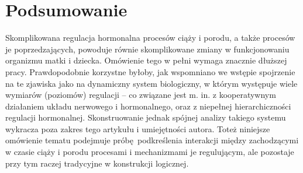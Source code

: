 \documentclass[two column, twoside, a4paper]{article}
\begin{document}
\section{Podsumowanie}

Skomplikowana regulacja hormonalna procesów ciąży i porodu, a także procesów je poprzedzających, powoduje równie skomplikowane zmiany w funkcjonowaniu organizmu matki i dziecka. Omówienie tego w pełni wymaga znacznie dłuższej pracy. Prawdopodobnie korzystne byłoby, jak wspomniano we wstępie spojrzenie na te zjawiska jako na dynamiczny system biologiczny, w którym występuje wiele wymiarów (poziomów) regulacji -- co związane jest m. in. z kooperatywnym działaniem układu nerwowego i hormonalnego, oraz z niepełnej hierarchiczności regulacji hormonalnej. Skonstruowanie jednak spójnej analizy takiego systemu wykracza poza zakres tego artykułu i umiejętności autora. Toteż niniejsze omówienie tematu podejmuje próbę podkreślenia interakcji między zachodzącymi w czasie ciąży i porodu procesami i mechanizmami je regulującym, ale pozostaje przy tym raczej tradycyjne w konstrukcji logicznej.

\printbibliography
\end{document}
